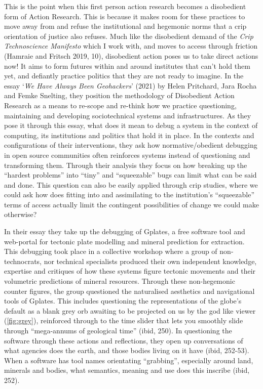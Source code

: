 This is the point when this first person action research becomes a
disobedient form of Action Research. This is because it makes room for
these practices to move away from and refuse the institutional and
hegemonic norms that a crip orientation of justice also refuses. Much
like the disobedient demand of the \emph{Crip Technoscience Manifesto}
which I work with, and moves to access through friction (Hamraie and
Fritsch 2019, 10), disobedient action poses us to take direct actions
now! It aims to form futures within and around institutes that can't
hold them yet, and defiantly practice politics that they are not ready
to imagine. In the essay `\emph{We Have Always Been Geohackers}' (2021)
by Helen Pritchard, Jara Rocha and Femke Snelting, they position the
methodology of Disobedient Action Research as a means to re-scope and
re-think how we practice questioning, maintaining and developing
sociotechnical systems and infrastructures. As they pose it through this
essay, what does it mean to debug a system in the context of computing,
its institutions and politics that hold it in place. In the contexts and
configurations of their interventions, they ask how normative/obedient
debugging in open source communities often reinforces systems instead of
questioning and transforming them. Through their analysis they focus on
how breaking up the ``hardest problems'' into ``tiny'' and
``squeezable'' bugs can limit what can be said and done. This question
can also be easily applied through crip studies, where we could ask how
does fitting into and assimilating to the institution's ``squeezable''
terms of access actually limit the contingent possibilities of change we
could make otherwise?

In their essay they take up the debugging of Gplates, a free software
tool and web-portal for tectonic plate modelling and mineral prediction
for extraction. This debugging took place in a collective workshop where
a group of non-technocrats, nor technical specialists produced their own
independent knowledge, expertise and critiques of how these systems
figure tectonic movements and their volumetric predictions of mineral
resources. Through these non-hegemonic counter figures, the group
questioned the naturalised aesthetics and navigational tools of Gplates.
This includes questioning the representations of the globe's default as
a blank grey orb awaiting to be projected on us by the god like viewer
(\cref{fig:grey}), reinforced through to the time slider that lets you
smoothly slide through ``mega-annums of geological time'' (ibid, 250).
In questioning the software through these actions and reflections, they
open up conversations of what agencies does the earth, and those bodies
living on it have (ibid, 252-53). When a software has tool names
orientating ``grabbing'', especially around land, minerals and bodies,
what semantics, meaning and use does this inscribe (ibid, 252).

